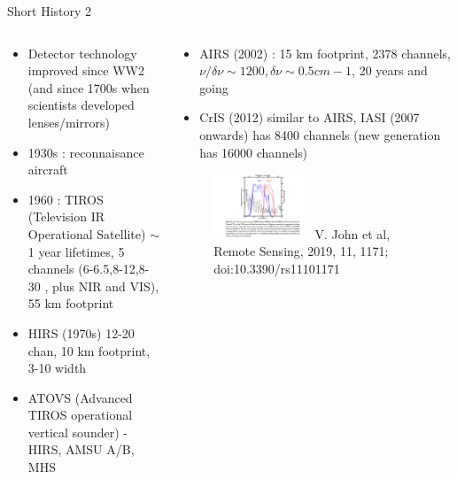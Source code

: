 \documentclass[10pt,t]{beamer}
\begin{document}
\begin{frame}[shrink=2]{Short History 2}

\vspace{-0.1in}
\begin{columns}

\begin{column}{0.55\columnwidth}
\begin{block}{}
\begin{itemize}
  \item Detector technology improved since WW2 (and since 1700s when scientists developed lenses/mirrors)
  \item 1930s : reconnaisance aircraft
  \item 1960 : TIROS (Television IR Operational Satellite) $\sim$ 1 year lifetimes, 5 channels (6-6.5,8-12,8-30 \um, 
         plus NIR and VIS), 55 km footprint
  \item HIRS (1970s) 12-20 chan, 10 km footprint, 3-10 \wn width
  \item ATOVS (Advanced TIROS operational vertical sounder) - HIRS, AMSU A/B, MHS
\end{itemize}  
\end{block}
\end{column}

\begin{column}{0.55\columnwidth}
\begin{block}{}
\begin{itemize}
  \item AIRS (2002) : 15 km footprint, 2378 channels, $\nu/\delta \nu \sim 1200, \delta \nu \sim 0.5 cm-1$, 20 years and going
  \item CrIS (2012) similar to AIRS, IASI (2007 onwards) has 8400 channels (new generation has 16000 channels)
\end{itemize}  
\begin{figure}
\begin{center}
\includegraphics[width=0.475\textwidth]{WEBFIGS/SRF_HIRS_IASI.png}
{\small V. John et al, Remote Sensing, 2019, 11, 1171; doi:10.3390/rs11101171}
\end{center}
\end{figure}
\end{block}
\end{column}
\end{columns}
\end{frame}
\end{document}
